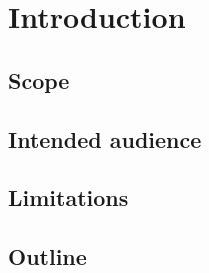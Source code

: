 
\chapter{Introduction} %

\label{chap:introd} %






\section{Scope}
\section{Intended audience}
\section{Limitations}
\section{Outline}

